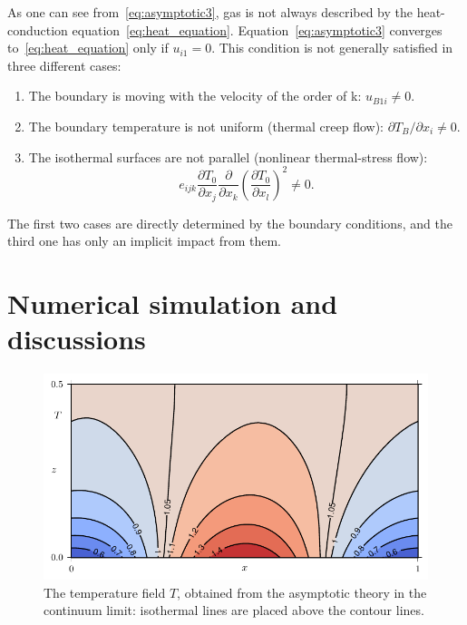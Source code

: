\documentclass[smallextended, referee]{svjour3} %
\newcommand{\pder}[2][]{\frac{\partial#1}{\partial#2}}
\newcommand{\Pder}[2][]{\partial#1/\partial#2}
\begin{document}
As one can see from~\eqref{eq:asymptotic3}, gas is not always described
by the heat-conduction equation~\eqref{eq:heat_equation}.
Equation~\eqref{eq:asymptotic3} converges to~\eqref{eq:heat_equation} only if \(u_{i1} = 0\).
This condition is not generally satisfied in three different cases:
\begin{enumerate}
	\item The boundary is moving with the velocity of the order of k: \(u_{B1i} \neq 0 \).
	\item The boundary temperature is not uniform (thermal creep flow): \(\Pder[T_B]{x_i} \neq 0 \).
	\item The isothermal surfaces are not parallel (nonlinear thermal-stress flow):
		\begin{equation}\label{eq:equilibrium}
			e_{ijk}\pder[T_0]{x_j}\pder{x_k}\left(\pder[T_0]{x_l}\right)^2 \neq 0.
		\end{equation}
\end{enumerate}

The first two cases are directly determined by the boundary conditions,
and the third one has only an implicit impact from them.

\section{Numerical simulation and discussions}

\begin{figure}[ht]
	\centering
	\includegraphics{Fig3}
	\caption{The temperature field \(T\), obtained from the asymptotic theory in the continuum limit:
		isothermal lines are placed above the contour lines.}
	\label{fig:moving:T_asym}
\end{figure}
\end{document}

